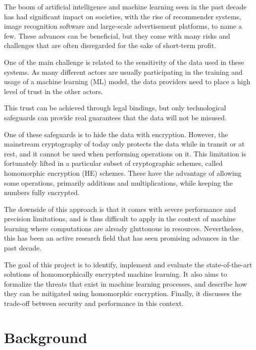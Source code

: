 \documentclass[a4paper,11pt,oneside]{report}
\begin{document}

The boom of artificial intelligence and machine learning seen in the past decade has had significant impact on societies, with the rise of recommender systems, image recognition software and large-scale advertisement platforms, to name a few. 
These advances can be beneficial, but they come with many risks and challenges that are often disregarded for the sake of short-term profit.

One of the main challenge is related to the sensitivity of the data used in these systems. 
As many different actors are usually participating in the training and usage of a machine learning (ML) model, the data providers need to place a high level of trust in the other actors.

This trust can be achieved through legal bindings, but only technological safeguards can provide real guarantees that the data will not be misused.

One of these safeguards is to hide the data with encryption. 
However, the mainstream cryptography of today only protects the data while in transit or at rest, and it cannot be used when performing operations on it. 
This limitation is fortunately lifted in a particular subset of cryptographic schemes, called homomorphic encryption (HE) schemes. 
These have the advantage of allowing some operations, primarily additions and multiplications, while keeping the numbers fully encrypted.

The downside of this approach is that it comes with severe performance and precision limitations, and is thus difficult to apply in the context of machine learning where computations are already gluttonous in resources. 
Nevertheless, this has been an active research field that has seen promising advances in the past decade.

The goal of this project is to identify, implement and evaluate the state-of-the-art solutions of homomorphically encrypted machine learning. 
It also aims to formalize the threats that exist in machine learning processes, and describe how they can be mitigated using homomorphic encryption.
Finally, it discusses the trade-off between security and performance in this context.


\chapter{Background}

\end{document}
